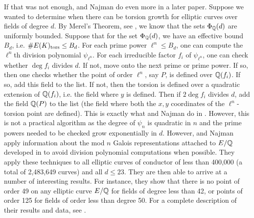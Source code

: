 If that was not enough, \gonjim{} and Najman do even more in a later paper. Suppose we wanted to determine when there can be torsion growth for elliptic curves over fields of degree $d$. By Merel's Theorem, see \cite{merel96}, we know that the sets $\Phi_{\mathbb{Q}}(d)$ are uniformly bounded. Suppose that for the set $\Phi_{\mathbb{Q}}(d)$, we have an effective bound $B_d$, i.e. $\#E(K)_{\text{tors}} \leq B_d$. For each prime power $\ell^n \leq B_d$, one can compute the $\ell^n$th division polynomial $\psi_{\ell^n}$. For each irreducible factor $f_i$ of $\psi_{\ell^n}$, one can check whether $\deg f_i$ divides $d$. If not, move onto the next prime or prime power. If so, then one checks whether the point of order $\ell^n$, say $P$, is defined over $\mathbb{Q}(f_i)$. If so, add this field to the list. If not, then the torsion is defined over a quadratic extension of $\mathbb{Q}(f_i)$, i.e. the field where $y$ is defined. Then if $2 \deg f_i$ divides $d$, add the field $\mathbb{Q}(P)$ to the list (the field where both the $x,y$ coordinates of the $\ell^n$-torsion point are defined). This is exactly what \gonjim{} and Najman do in \cite{gonzalezjimeneznajman20}. However, this is not a practical algorithm as the degree of $\psi_n$ is quadratic in $n$ and the prime powers needed to be checked grow exponentially in $d$. However, \gonjim{} and Najman apply information about the mod $n$ Galois representations attached to $E/\mathbb{Q}$ developed in \cite{gonzalezjimeneznajman20base} to avoid division polynomial computations when possible. They apply these techniques to all elliptic curves of conductor of less than 400,000 (a total of 2,483,649 curves) and all $d \leq 23$. They are then able to arrive at a number of interesting results. For instance, they show that there is no point of order 49 on any elliptic curve $E/\mathbb{Q}$ for fields of degree less than 42, or points of order 125 for fields of order less than degree 50. For a complete description of their results and data, see \cite{gonzalezjimeneznajman20}. 


